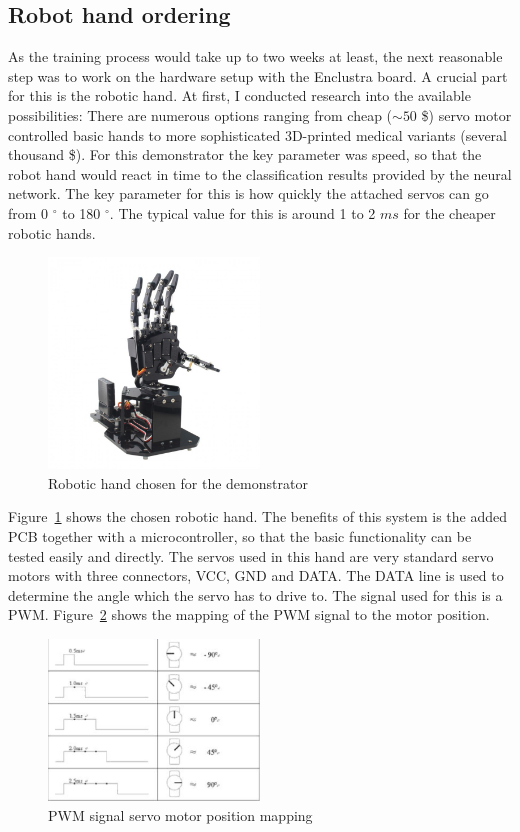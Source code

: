 \subsection{Robot hand ordering}
As the training process would take up to two weeks at least, the next reasonable step was to work on the hardware setup with the Enclustra board. A crucial part for this is the robotic hand. At first, I conducted research into the available possibilities: There are numerous options ranging from cheap ($\sim 50$ \$) servo motor controlled basic hands to more sophisticated 3D-printed medical variants (several thousand \$). For this demonstrator the key parameter was speed, so that the robot hand would react in time to the classification results provided by the neural network. The key parameter for this is how quickly the attached servos can go from 0 $^\circ$ to 180 $^\circ$. The typical value for this is around 1 to 2 $ms$ for the cheaper robotic hands.
\begin{figure}[!htb]
	\centering
		\includegraphics[width=0.5\textwidth]{bilder/robohand.jpg}
		\caption{Robotic hand chosen for the demonstrator}
		\label{fig:robohand}
\end{figure}
Figure~\ref{fig:robohand} shows the chosen robotic hand. The benefits of this system is the added \ac{PCB} together with a microcontroller, so that the basic functionality can be tested easily and directly. The servos used in this hand are very standard servo motors with three connectors, VCC, GND and DATA. The DATA line is used to determine the angle which the servo has to drive to. The signal used for this is a \ac{PWM}. Figure~\ref{fig:pwm_servo} shows the mapping of the \ac{PWM} signal to the motor position.
\begin{figure}[!htb]
	\centering
		\includegraphics[width=0.5\textwidth]{bilder/pwm.png}
		\caption{\acs{PWM} signal servo motor position mapping}
		\label{fig:pwm_servo}
\end{figure}
